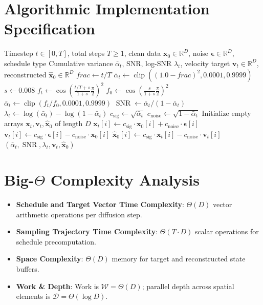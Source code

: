 \documentclass[11pt,a4paper]{article}
\theoremstyle{definition}
\begin{document}
\section{Algorithmic Implementation Specification}

\begin{algorithm}[H]
\caption{Noise Schedule Calculation and Velocity Target Synthesis}
\begin{algorithmic}[1]
\Require Timestep $t \in [0, T]$, total steps $T \ge 1$, clean data $\mathbf{x}_0 \in \mathbb{R}^D$, noise $\boldsymbol{\epsilon} \in \mathbb{R}^D$, schedule type
\Ensure Cumulative variance $\bar{\alpha}_t$, SNR, log-SNR $\lambda_t$, velocity target $\mathbf{v}_t \in \mathbb{R}^D$, reconstructed $\hat{\mathbf{x}}_0 \in \mathbb{R}^D$
    \State $frac \gets t / T$
    \State $\bar{\alpha}_t \gets \operatorname{clip}((1.0 - frac)^2, 0.0001, 0.9999)$
\Else
    \State $s \gets 0.008$
    \State $f_t \gets \cos\left( \frac{t/T + s}{1 + s} \frac{\pi}{2} \right)^2$
    \State $f_0 \gets \cos\left( \frac{s}{1 + s} \frac{\pi}{2} \right)^2$
    \State $\bar{\alpha}_t \gets \operatorname{clip}(f_t / f_0, 0.0001, 0.9999)$
\EndIf
\State $\operatorname{SNR} \gets \bar{\alpha}_t / (1 - \bar{\alpha}_t)$
\State $\lambda_t \gets \log(\bar{\alpha}_t) - \log(1 - \bar{\alpha}_t)$
\State $c_{\text{sig}} \gets \sqrt{\bar{\alpha}_t}$
\State $c_{\text{noise}} \gets \sqrt{1 - \bar{\alpha}_t}$
\State Initialize empty arrays $\mathbf{x}_t, \mathbf{v}_t, \hat{\mathbf{x}}_0$ of length $D$
    \State $\mathbf{x}_t[i] \gets c_{\text{sig}} \cdot \mathbf{x}_0[i] + c_{\text{noise}} \cdot \boldsymbol{\epsilon}[i]$
    \State $\mathbf{v}_t[i] \gets c_{\text{sig}} \cdot \boldsymbol{\epsilon}[i] - c_{\text{noise}} \cdot \mathbf{x}_0[i]$
    \State $\hat{\mathbf{x}}_0[i] \gets c_{\text{sig}} \cdot \mathbf{x}_t[i] - c_{\text{noise}} \cdot \mathbf{v}_t[i]$
\EndFor
\State \Return $(\bar{\alpha}_t, \operatorname{SNR}, \lambda_t, \mathbf{v}_t, \hat{\mathbf{x}}_0)$
\end{algorithmic}
\end{algorithm}

\section{Big-$\Theta$ Complexity Analysis}

\begin{itemize}
    \item \textbf{Schedule and Target Vector Time Complexity}: $\Theta(D)$ vector arithmetic operations per diffusion step.
    \item \textbf{Sampling Trajectory Time Complexity}: $\Theta(T \cdot D)$ scalar operations for schedule precomputation.
    \item \textbf{Space Complexity}: $\Theta(D)$ memory for target and reconstructed state buffers.
    \item \textbf{Work \& Depth}: Work is $\mathcal{W} = \Theta(D)$; parallel depth across spatial elements is $\mathcal{D} = \Theta(\log D)$.
\end{itemize}
\end{document}
